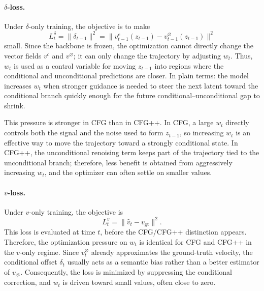 \documentclass[acmtog]{acmart}
\begin{document}
\paragraph{\(\delta\)-loss.}
Under \(\delta\)-only training, the objective is to make
\begin{equation}
L_t^\delta = \|\delta_{t-1}\|^2
=
\|v_{t-1}^c(z_{t-1}) - v_{t-1}^{\varnothing}(z_{t-1})\|^2
\end{equation}
small.
Since the backbone is frozen, the optimization cannot directly change the vector fields \(v^c\) and \(v^{\varnothing}\); it can only change the trajectory by adjusting \(w_t\).
Thus, \(w_t\) is used as a control variable for moving \(z_{t-1}\) into regions where the conditional and unconditional predictions are closer.
In plain terms: the model increases \(w_t\) when stronger guidance is needed to steer the next latent toward the conditional branch quickly enough for the future conditional--unconditional gap to shrink.

This pressure is stronger in CFG than in CFG++.
In CFG, a large \(w_t\) directly controls both the signal and the noise used to form \(z_{t-1}\), so increasing \(w_t\) is an effective way to move the trajectory toward a strongly conditional state.
In CFG++, the unconditional renoising term keeps part of the trajectory tied to the unconditional branch; therefore, less benefit is obtained from aggressively increasing \(w_t\), and the optimizer can often settle on smaller values.

\paragraph{\(v\)-loss.}
Under \(v\)-only training, the objective is
\begin{equation}
L_t^v = \|\hat v_t - v_{\mathrm{gt}}\|^2.
\end{equation}
This loss is evaluated at time \(t\), before the CFG/CFG++ distinction appears.
Therefore, the optimization pressure on \(w_t\) is identical for CFG and CFG++ in the \(v\)-only regime.
Since \(v_t^{\varnothing}\) already approximates the ground-truth velocity, the conditional offset \(\delta_t\) usually acts as a semantic bias rather than a better estimator of \(v_{\mathrm{gt}}\).
Consequently, the loss is minimized by suppressing the conditional correction, and \(w_t\) is driven toward small values, often close to zero.
\end{document}
